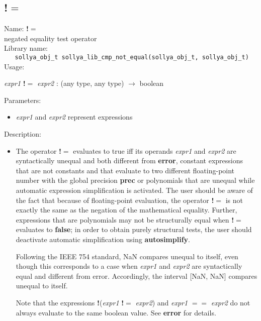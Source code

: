 \subsection{!$=$}
\label{labneq}
\noindent Name: \textbf{!$=$}\\
\phantom{aaa}negated equality test operator\\[0.2cm]
\noindent Library name:\\
\verb|   sollya_obj_t sollya_lib_cmp_not_equal(sollya_obj_t, sollya_obj_t)|\\[0.2cm]
\noindent Usage: 
\begin{center}
\emph{expr1} \textbf{!$=$} \emph{expr2} : (\textsf{any type}, \textsf{any type}) $\rightarrow$ \textsf{boolean}\\
\end{center}
Parameters: 
\begin{itemize}
\item \emph{expr1} and \emph{expr2} represent expressions
\end{itemize}
\noindent Description: \begin{itemize}

\item The operator \textbf{!$=$} evaluates to true iff its operands \emph{expr1} and
   \emph{expr2} are syntactically unequal and both different from \textbf{error},
   constant expressions that are not constants and that evaluate to two
   different floating-point number with the global precision \textbf{prec} or 
   polynomials that are unequal while automatic expression simplification 
   is activated. The user should be aware of the fact that because of 
   floating-point evaluation, the operator \textbf{!$=$} is not exactly the 
   same as the negation of the mathematical equality. Further, expressions 
   that are polynomials may not be structurally equal when \textbf{!$=$} evaluates 
   to \textbf{false}; in order to obtain purely structural tests, the user should 
   deactivate automatic simplification using \textbf{autosimplify}.
    
   Following the IEEE 754 standard, NaN compares unequal to itself, even though
   this corresponds to a case when \emph{expr1} and \emph{expr2} are syntactically equal
   and different from error. Accordingly, the interval [NaN, NaN] compares
   unequal to itself.
    
   Note that the expressions \textbf{!}(\emph{expr1} \textbf{!$=$} \emph{expr2}) and \emph{expr1} \textbf{$==$} \emph{expr2}
   do not always evaluate to the same boolean value. See \textbf{error} for details.
\end{itemize}
